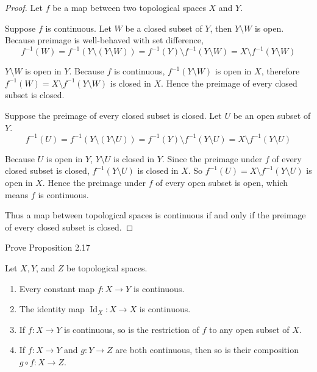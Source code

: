 \begin{proof}
	Let $f$ be a map between two topological spaces $X$ and $Y$.

	Suppose $f$ is continuous. Let $W$ be a closed subset of $Y$, then $Y\setminus W$ is open. Because preimage is well-behaved with set difference,
	\[
		f^{-1}(W) = f^{-1}(Y\setminus (Y\setminus W)) = f^{-1}(Y)\setminus f^{-1}(Y\setminus W) = X\setminus f^{-1}(Y\setminus W)
	\]

	$Y\setminus W$ is open in $Y$. Because $f$ is continuous, $f^{-1}(Y\setminus W)$ is open in $X$, therefore $f^{-1}(W) = X\setminus f^{-1}(Y\setminus W)$ is closed in $X$. Hence the preimage of every closed subset is closed.

	Suppose the preimage of every closed subset is closed. Let $U$ be an open subset of $Y$.
	\[
		f^{-1}(U) = f^{-1}(Y\setminus (Y\setminus U)) = f^{-1}(Y)\setminus f^{-1}(Y\setminus U) = X\setminus f^{-1}(Y\setminus U)
	\]

	Because $U$ is open in $Y$, $Y\setminus U$ is closed in $Y$. Since the preimage under $f$ of every closed subset is closed, $f^{-1}(Y\setminus U)$ is closed in $X$. So $f^{-1}(U) = X\setminus f^{-1}(Y\setminus U)$ is open in $X$. Hence the preimage under $f$ of every open subset is open, which means $f$ is continuous.

	Thus a map between topological spaces is continuous if and only if the preimage of every closed subset is closed.
\end{proof}

\begin{exercise}{2.18}\label{exercise:2.18}
	Prove Proposition 2.17

	Let $X, Y$, and $Z$ be topological spaces.

	\begin{enumerate}[label={(\alph*)}]
		\item Every constant map $f: X\to Y$ is continuous.
		\item The identity map $\operatorname{Id}_{X}: X\to X$ is continuous.
		\item If $f: X\to Y$ is continuous, so is the restriction of $f$ to any open subset of $X$.
		\item If $f: X\to Y$ and $g: Y\to Z$ are both continuous, then so is their composition $g\circ f: X\to Z$.
	\end{enumerate}
\end{exercise}

